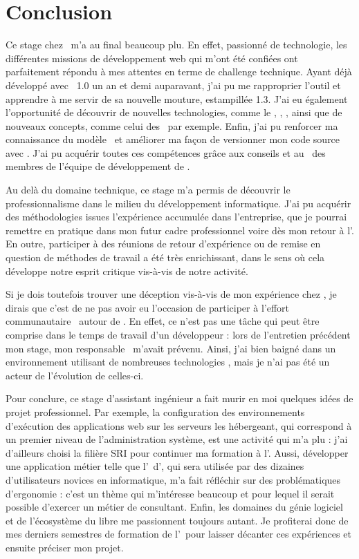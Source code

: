 \chapter{Conclusion}

Ce stage chez \asl\ m'a au final beaucoup plu. En effet, passionné de technologie, les différentes missions de développement web qui m'ont été confiées ont parfaitement répondu à mes attentes en terme de challenge technique. Ayant déjà développé avec \asf~1.0 un an et demi auparavant, j'ai pu me rapproprier l'outil et apprendre à me servir de sa nouvelle mouture, estampillée 1.3. J'ai eu également l'opportunité de découvrir de nouvelles technologies, comme le \ajs, \ajquery, \aajax, ainsi que de nouveaux concepts, comme celui des \awss\ par exemple. Enfin, j'ai pu renforcer ma connaissance du modèle \amvc\ et améliorer ma façon de versionner mon code source avec \asvn. J'ai pu acquérir toutes ces compétences grâce aux conseils et au \acoaching\ des membres de l'équipe de développement de \asl.

Au delà du domaine technique, ce stage m'a permis de découvrir le professionnalisme dans le milieu du développement informatique. J'ai pu acquérir des méthodologies issues l'expérience accumulée dans l'entreprise, que je pourrai remettre en pratique dans mon futur cadre professionnel voire dès mon retour à l'\autc. En outre, participer à des réunions de retour d'expérience ou de remise en question de méthodes de travail a été très enrichissant, dans le sens où cela développe notre esprit critique vis-à-vis de notre activité.

Si je dois toutefois trouver une déception vis-à-vis de mon expérience chez \asl, je dirais que c'est de ne pas avoir eu l'occasion de participer à l'effort communautaire \aos\ autour de \asf. En effet, ce n'est pas une tâche qui peut être comprise dans le temps de travail d'un développeur : lors de l'entretien précédent mon stage, mon responsable \ahugon\ m'avait prévenu. Ainsi, j'ai bien baigné dans un environnement utilisant de nombreuses technologies \aos, mais je n'ai pas été un acteur de l'évolution de celles-ci.

Pour conclure, ce stage d'assistant ingénieur a fait murir en moi quelques idées de projet professionnel. Par exemple, la configuration des environnements d'exécution des applications web sur les serveurs les hébergeant, qui correspond à un premier niveau de l'administration système, est une activité qui m'a plu : j'ai d'ailleurs choisi la filière SRI pour continuer ma formation à l'\autc. Aussi, développer une application métier telle que l'\aintranet\ d'\aey, qui sera utilisée par des dizaines d'utilisateurs novices en informatique, m'a fait réfléchir sur des problématiques d'ergonomie : c'est un thème qui m'intéresse beaucoup et pour lequel il serait possible d'exercer un métier de consultant. Enfin, les domaines du génie logiciel et de l'écosystème du libre me passionnent toujours autant. Je profiterai donc de mes derniers semestres de formation de l'\autc\ pour laisser décanter ces expériences et ensuite préciser mon projet.
